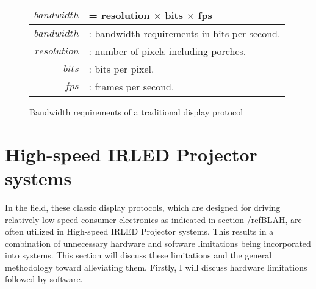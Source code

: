 \begin{figure}
    \centering
    \large
    \begin{tabular}{| r l |}
        \hline
        $$bandwidth$$ & = resolution $\times$ bits $\times$ fps \\ \hline
        $bandwidth$ & : bandwidth requirements in bits per second. \\
        $resolution$ & : number of pixels including porches. \\
        $bits$ & : bits per pixel. \\
        $fps$ & : frames per second. \\
        \hline
    \end{tabular}
    \caption{Bandwidth requirements of a traditional display protocol}
    \label{fig:bandwidth}
\end{figure}

\section{High-speed IRLED Projector systems}
%

In the field, these classic display protocols, which are designed for driving relatively low speed consumer electronics as indicated in section /ref{BLAH}, are often utilized in High-speed IRLED Projector systems. This results in a combination of unnecessary hardware and software limitations being incorporated into systems. This section will discuss these limitations and the general methodology toward alleviating them. Firstly, I will discuss hardware limitations followed by software.

